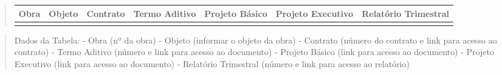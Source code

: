 \documentclass[
]{book}
\begin{document}
\begin{quote}
\begin{longtable}[]{@{}lllllll@{}}
\toprule
\begin{minipage}[b]{0.08\columnwidth}\raggedright
Obra\strut
\end{minipage} & \begin{minipage}[b]{0.10\columnwidth}\raggedright
Objeto\strut
\end{minipage} & \begin{minipage}[b]{0.08\columnwidth}\raggedright
Contrato\strut
\end{minipage} & \begin{minipage}[b]{0.13\columnwidth}\raggedright
Termo Aditivo\strut
\end{minipage} & \begin{minipage}[b]{0.11\columnwidth}\raggedright
Projeto Básico\strut
\end{minipage} & \begin{minipage}[b]{0.14\columnwidth}\raggedright
Projeto Executivo\strut
\end{minipage} & \begin{minipage}[b]{0.17\columnwidth}\raggedright
Relatório Trimestral\strut
\end{minipage}\tabularnewline
\midrule
\endhead
\begin{minipage}[t]{0.08\columnwidth}\raggedright
\strut
\end{minipage} & \begin{minipage}[t]{0.10\columnwidth}\raggedright
\strut
\end{minipage} & \begin{minipage}[t]{0.08\columnwidth}\raggedright
\strut
\end{minipage} & \begin{minipage}[t]{0.13\columnwidth}\raggedright
\strut
\end{minipage} & \begin{minipage}[t]{0.11\columnwidth}\raggedright
\strut
\end{minipage} & \begin{minipage}[t]{0.14\columnwidth}\raggedright
\strut
\end{minipage} & \begin{minipage}[t]{0.17\columnwidth}\raggedright
\strut
\end{minipage}\tabularnewline
\bottomrule
\end{longtable}
\end{quote}

\begin{quote}
Dados da Tabela:
- Obra (nº da obra)
- Objeto (informar o objeto da obra)
- Contrato (número do contrato e link para acesso ao contrato)
- Termo Aditivo (número e link para acesso ao documento)
- Projeto Básico (link para acesso ao documento)
- Projeto Executivo (link para acesso ao documento)
- Relatório Trimestral (número e link para acesso ao relatório)
\end{quote}
\end{document}
